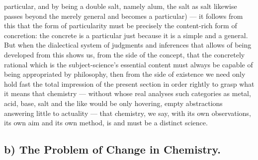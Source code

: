 \documentclass[12pt,a4paper]{book}
\newcommand{\decompscheme}[6]{%
  \begin{center}
  \begin{tikzpicture}[baseline,every node/.style={inner sep=1.5pt,outer sep=2pt}]
    \node[anchor=west] (r1) at (0,2.55) {#1};
    \node[anchor=west] (r2) at (0,1.70) {#2};
    \node[anchor=west] (r3) at (0,0.85) {#3};
    \node[anchor=west] (r4) at (0,0.00) {#4};
    \node[anchor=west] (p1) at (5.4,2.125) {#5};
    \node[anchor=west] (p2) at (5.4,0.425) {#6};
    \draw[decorate,decoration={brace,amplitude=5pt}]
         (-0.22,2.85) -- (-0.22,1.40);
    \draw[decorate,decoration={brace,amplitude=5pt}]
         (-0.22,1.15) -- (-0.22,-0.30);
    \draw (r1.east) -- (p1.west);
    \draw (r3.east) -- (p1.west);
    \draw (r2.east) -- (p2.west);
    \draw (r4.east) -- (p2.west);
  \end{tikzpicture}
  \end{center}}
\begin{document}
particular, and by being a double salt, namely alum, the salt as salt likewise
passes beyond the merely general and becomes a particular) --- it follows from
this that the form of particularity must be precisely the content-rich form of
concretion: the concrete is a particular just because it is a simple and a
general. But when the dialectical system of judgments and inferences that
allows of being developed from this shows us, from the side of the concept,
that the concretely rational which is the subject-science's essential content
must always be capable of being appropriated by philosophy, then from the side
of existence we need only hold fast the total impression of the present section
in order rightly to grasp what it means that chemistry --- without whose real
analyses such categories as metal, acid, base, salt and the like would be only
hovering, empty abstractions answering little to actuality --- that chemistry,
we say, with its own observations, its own aim and its own method, is and must
be a distinct science.

\subsection*{b) The Problem of Change in Chemistry.}
\end{document}
